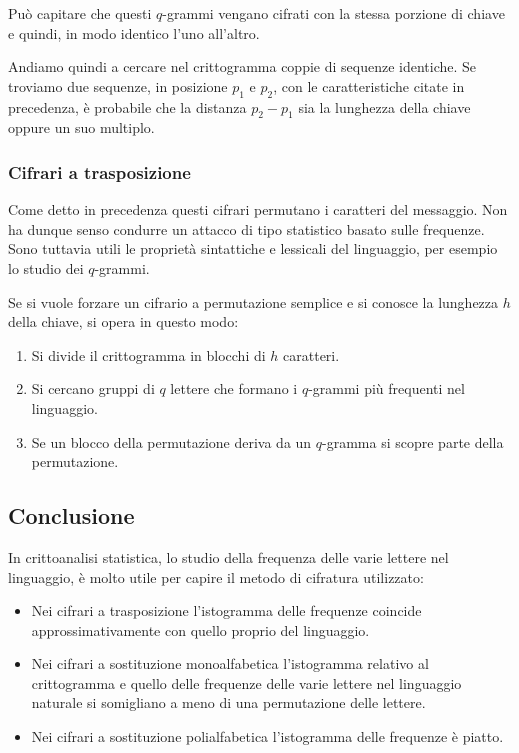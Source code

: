 Pu\`o capitare che questi $q$-grammi vengano cifrati con la stessa porzione di chiave e quindi, in modo identico l'uno
all'altro.

Andiamo quindi a cercare nel crittogramma coppie di sequenze identiche. Se troviamo due sequenze, in posizione $p_1$ e
$p_2$, con le caratteristiche citate in precedenza, \`e probabile che la distanza $p_2 - p_1$ sia la lunghezza della
chiave oppure un suo multiplo.

\subsubsection{Cifrari a trasposizione}
Come detto in precedenza questi cifrari permutano i caratteri del messaggio. Non ha dunque senso condurre un attacco di
tipo statistico basato sulle frequenze. Sono tuttavia utili le propriet\`a sintattiche e lessicali del linguaggio, per
esempio lo studio dei $q$-grammi.

Se si vuole forzare un cifrario a permutazione semplice e si conosce la lunghezza $h$ della chiave, si opera in questo
modo:
\begin{enumerate}
	\item Si divide il crittogramma in blocchi di $h$ caratteri.
	\item Si cercano gruppi di $q$ lettere che formano i $q$-grammi pi\`u frequenti nel linguaggio.
	\item Se un blocco della permutazione deriva da un $q$-gramma si scopre parte della permutazione.
\end{enumerate}

\subsection{Conclusione}
In crittoanalisi statistica, lo studio della frequenza delle varie lettere nel linguaggio, \`e molto utile per capire
il metodo di cifratura utilizzato:
\begin{itemize}
	\item Nei cifrari a trasposizione l'istogramma delle frequenze coincide approssimativamente con quello proprio del
	      linguaggio.
	\item Nei cifrari a sostituzione monoalfabetica l'istogramma relativo al crittogramma e quello delle frequenze delle
	      varie lettere nel linguaggio naturale si somigliano a meno di una permutazione delle lettere.
	\item Nei cifrari a sostituzione polialfabetica l'istogramma delle frequenze \`e piatto.
\end{itemize}

